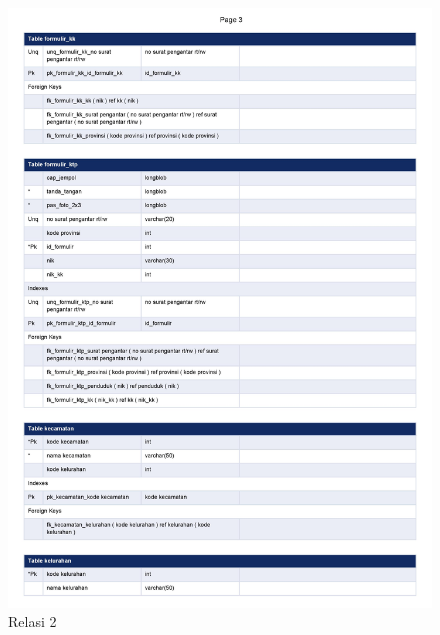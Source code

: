\begin{figure}[H]
	\centering
	\includegraphics[width=12cm]{figures/0004.jpg}
	\caption{Relasi 2}
\end{figure}
